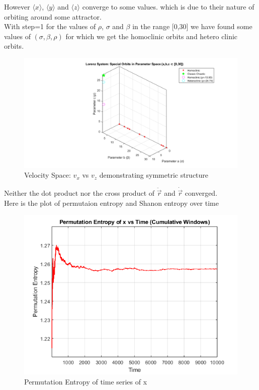 \documentclass[%
reprint,
amsmath,amssymb,
aps,
floatfix,
]{revtex4-2}
\begin{document}
	\FloatBarrier
	However $\langle x\rangle$, $\langle y\rangle$ and  $\langle z\rangle$ converge to some values. which is due to their nature of orbiting around some attractor. \\
	With step=1 for the values of $\rho$, $\sigma$ and $\beta$ in the range [0,30] we have found some values of $(\sigma, \beta, \rho )$ for which we get the homoclinic orbits and hetero clinic orbits.
	\FloatBarrier
	\begin{figure}[htbp]
		\centering
		\includegraphics[width=0.8\linewidth]{homoclinic_heteroclinic_points.png}
		\caption{Velocity Space: $v_x$ vs $v_z$ demonstrating symmetric structure}
		\label{fig:vx_vz}
	\end{figure}
	\FloatBarrier
	Neither the dot product nor the cross product of $\ddot{\vec{r}}$ and $\dot{\vec{r}}$ converged.\\
	Here is the plot of permutaion entropy and Shanon entropy  over time
	\begin{figure}[htbp]
		\centering
		\includegraphics[width=0.8\linewidth]{PE_vs_time_x.png}
		\caption{Permutation Entropy of time series of x}
		\label{fig:vx_vz}
	\end{figure}
\end{document}
